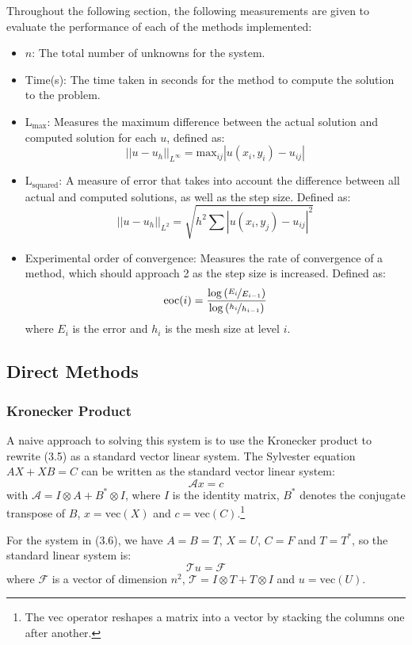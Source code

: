 \documentclass{article}
\numberwithin{equation}{section}
\begin{document}
Throughout the following section, the following measurements are given to evaluate the performance of each of the methods implemented:
\begin{itemize}
\item $n$: The total number of unknowns for the system.
\item Time(s): The time taken in seconds for the method to compute the solution to the problem.
\item L$_{\text{max}}$: Measures the maximum difference between the actual solution and computed solution for each $u$, defined as:
 \[ || u - u_h ||_{L^\infty} = \text{max}_{ij} | u(x_i, y_i) - u_{ij} | \]
\item L$_{\text{squared}}$: A measure of error that takes into account the difference between all actual and computed solutions, as well as the step size. Defined as:
\[ || u - u_h ||_{L^2} = \sqrt{h^2 \sum | u(x_i,y_j) - u_{ij} |^2} \]
\item Experimental order of convergence: Measures the rate of convergence of a method, which should approach 2 as the step size is increased. Defined as:
\[ \text{eoc}(i) = \frac{\log{(\nicefrac{E_i}{E_{i-1}})}}{\log{(\nicefrac{h_i}{h_{i-1}})}} \]
where $E_i$ is the error and $h_i$ is the mesh size at level $i$. 
\end{itemize}

\subsection{Direct Methods}

\subsubsection{Kronecker Product}
A naive approach to solving this system is to use the Kronecker product to rewrite (3.5) as a standard vector linear system. The Sylvester equation $AX + XB = C$ can be written as the standard vector linear system:
\begin{equation}
\mathcal{A}x = c
\end{equation}
with $\mathcal{A} = I \otimes A + B^* \otimes I$, where $I$ is the identity matrix, $B^*$ denotes the conjugate transpose of $B$, $x = \text{vec}(X)$ and $c = \text{vec}(C)$.\footnote{The vec operator reshapes a matrix into a vector by stacking the columns one after another.}

For the system in (3.6), we have $A=B=T$, $X=U$, $C=F$ and $T=T^*$, so the standard linear system is:
\begin{equation}
\mathcal{T}u = \mathcal{F}
\end{equation}
where $\mathcal{F}$ is a vector of dimension $n^2$, $\mathcal{T} = I \otimes T + T \otimes I$ and $u = \text{vec}(U)$. 
\end{document}
